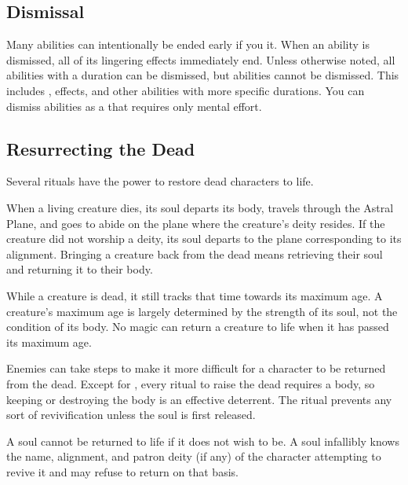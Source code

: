     \subsection{Dismissal}\label{Dismissal}
        Many abilities can intentionally be ended early if you  it.
        When an ability is dismissed, all of its lingering effects immediately end.
        Unless otherwise noted, all \magical abilities with a duration can be dismissed, but  abilities cannot be dismissed.
        This includes ,  effects, and other abilities with more specific durations.
        You can dismiss abilities as a  that requires only mental effort.

    \subsection{Resurrecting the Dead}\label{Resurrecting the Dead}
        Several rituals have the power to restore dead characters to life.

        When a living creature dies, its soul departs its body, travels through the Astral Plane, and goes to abide on the plane where the creature's deity resides.
        If the creature did not worship a deity, its soul departs to the plane corresponding to its alignment.
        Bringing a creature back from the dead means retrieving their soul and returning it to their body.

         While a creature is dead, it still tracks that time towards its maximum age.
        A creature's maximum age is largely determined by the strength of its soul, not the condition of its body.
        No magic can return a creature to life when it has passed its maximum age.

         Enemies can take steps to make it more difficult for a character to be returned from the dead.
        Except for , every ritual to raise the dead requires a body, so keeping or destroying the body is an effective deterrent.
        The  ritual prevents any sort of revivification unless the soul is first released.

         A soul cannot be returned to life if it does not wish to be.
        A soul infallibly knows the name, alignment, and patron deity (if any) of the character attempting to revive it and may refuse to return on that basis.


